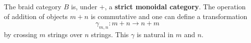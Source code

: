 The braid category $B$ is, under $+$, a \textbf{strict monoidal category}. The operation of addition of objects $m + n$ is commutative and one can define a transformation
$$\gamma_{m,n} : m + n \to n + m$$
by crossing $m$ strings over $n$ strings. This $\gamma$ is natural in $m$ and $n$.
